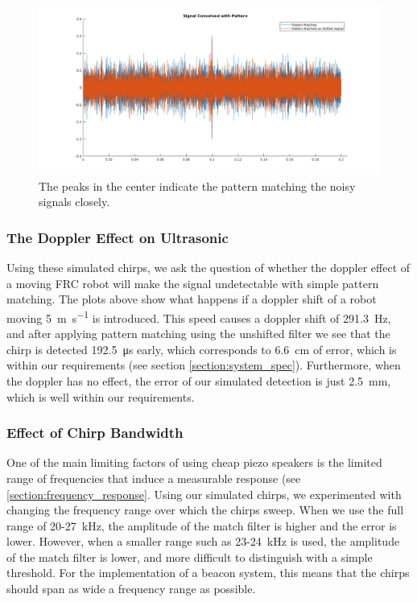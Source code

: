 \documentclass{article}
\begin{document}
    \begin{figure}
      \centering
      \includegraphics[width=1\linewidth]{./images/pattern_matching.png}
      \caption{The peaks in the center indicate the pattern matching the noisy signals closely.}
      \label{fig:pattern_matching}
    \end{figure}

    \subsubsection{The Doppler Effect on Ultrasonic}

      Using these simulated chirps, we ask the question of whether the doppler effect of a moving FRC robot will make the signal undetectable with simple pattern matching. The plots above show what happens if a doppler shift of a robot moving \SI{5}{\meter\per\second} is introduced. This speed causes a doppler shift of \SI{291.3}{\hertz}, and after applying pattern matching using the unshifted filter we see that the chirp is detected \SI{192.5}{\micro\second} early, which corresponds to \SI{6.6}{\centi\meter} of error, which is within our requirements (see section \ref{section:system_spec}). Furthermore, when the doppler has no effect, the error of our simulated detection is just \SI{2.5}{\milli\meter}, which is well within our requirements.

    \subsubsection{Effect of Chirp Bandwidth}

      One of the main limiting factors of using cheap piezo speakers is the limited range of frequencies that induce a measurable response (see \ref{section:frequency_response}. Using our simulated chirps, we experimented with changing the frequency range over which the chirps sweep. When we use the full range of 20-27\SI{}{\kilo\hertz}, the amplitude of the match filter is higher and the error is lower. However, when a smaller range such as 23-24\SI{}{\kilo\hertz} is used, the amplitude of the match filter is lower, and more difficult to distinguish with a simple threshold. For the implementation of a beacon system, this means that the chirps should span as wide a frequency range as possible.
\end{document}
